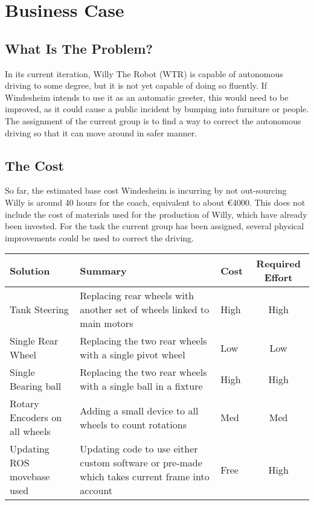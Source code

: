 \section{Business Case}


\subsection{What Is The Problem?}
In its current iteration, Willy The Robot (WTR) is capable of autonomous driving to some degree, but it is not yet capable of doing so fluently.
If Windesheim intends to use it as an automatic greeter, this would need to be improved, as it could cause a public incident by bumping into furniture or people.
The assignment of the current group is to find a way to correct the autonomous driving so that it can move around in safer manner.

\subsection{The Cost}
So far, the estimated base cost Windesheim is incurring by not out-sourcing Willy is around 40 hours for the coach, equivalent to about \euro 4000.
This does not include the cost of materials used for the production of Willy, which have already been invested.
For the task the current group has been assigned, several physical improvements could be used to correct the driving.

\begin{tabular}{|L{3cm}|L{6cm}|l|c|}
\hline
Solution		  & Summary 															  & Cost 	&Required Effort \\ \hline
Tank Steering & Replacing rear wheels with another set of wheels linked to main motors & High 	& High			\\ \hline
Single Rear Wheel & Replacing the two rear wheels with a single pivot wheel 		    	  & Low		& Low			\\ \hline
Single Bearing ball & Replacing the two rear wheels with a single ball in a fixture   & High  	& High			\\ \hline
Rotary Encoders on all wheels & Adding a small device to all wheels to count rotations & Med   	& Med			\\ \hline
Updating ROS movebase used & Updating code to use either custom software or pre-made which takes current frame into account & Free & High \\ \hline
\end{tabular}


